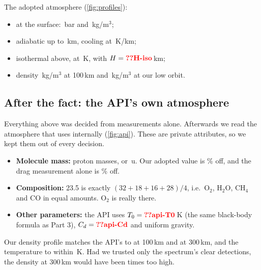 \documentclass[aps,prd,twocolumn,nofootinbib,floatfix,superscriptaddress]{revtex4-2}
\begin{document}
The adopted atmosphere (\cref{fig:profiles}):
\begin{itemize}
\item at the surface: \,bar and \,kg/m$^3$;
\item adiabatic up to \,km, cooling at \,K/km;
\item isothermal above, at \,K, with $H=\val{H-iso}$\,km;
\item density \,kg/m$^3$ at 100\,km and \,kg/m$^3$ at our low orbit.
\end{itemize}

\subsection{After the fact: the API's own atmosphere}
Everything above was decided from measurements alone.
Afterwards we read the atmosphere that  uses internally (\cref{fig:api}).
These are private attributes, so we kept them out of every decision.
\begin{itemize}
\item \textbf{Molecule mass:}  proton masses, or \,u. Our adopted value is \% off, and the drag measurement alone is \% off.
\item \textbf{Composition:} 23.5 is exactly $(32+18+16+28)/4$, i.e.\ O$_2$, H$_2$O, CH$_4$ and CO in equal amounts. O$_2$ is really there.
\item \textbf{Other parameters:} the API uses $T_0=\val{api-T0}$\,K (the same black-body formula as Part 3), $C_d=\val{api-Cd}$ and uniform gravity.
\end{itemize}
Our density profile matches the API's to  at 100\,km and  at 300\,km, and the temperature to within \,K.
Had we trusted only the spectrum's clear detections, the density at 300\,km would have been  times too high.

\end{document}

